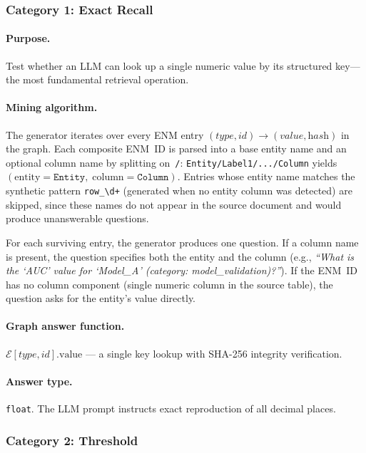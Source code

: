 \documentclass[11pt]{article}
\begin{document}
\subsubsection{Category 1: Exact Recall}

\paragraph{Purpose.}  Test whether an LLM can look up a single numeric
value by its structured key---the most fundamental retrieval operation.

\paragraph{Mining algorithm.}
The generator iterates over every ENM entry
$(\textit{type}, \textit{id}) \to (\textit{value}, \textit{hash})$ in the
graph.  Each composite ENM~ID is parsed into a base entity name and an
optional column name by splitting on~\texttt{/}:
\texttt{Entity/Label1/.../Column} yields
$(\text{entity} = \texttt{Entity},\; \text{column} = \texttt{Column})$.
Entries whose entity name matches the synthetic pattern \texttt{row\_\textbackslash d+}
(generated when no entity column was detected) are skipped, since these
names do not appear in the source document and would produce unanswerable
questions.

For each surviving entry, the generator produces one question.  If a
column name is present, the question specifies both the entity and the
column (e.g., \emph{``What is the `AUC' value for `Model\_A' (category:
model\_validation)?''}).  If the ENM~ID has no column component (single
numeric column in the source table), the question asks for the entity's
value directly.

\paragraph{Graph answer function.}
$\mathcal{E}[\textit{type}, \textit{id}].\text{value}$ --- a single
key lookup with SHA-256 integrity verification.

\paragraph{Answer type.} \texttt{float}.  The LLM prompt instructs exact
reproduction of all decimal places.

\subsubsection{Category 2: Threshold}
\end{document}
